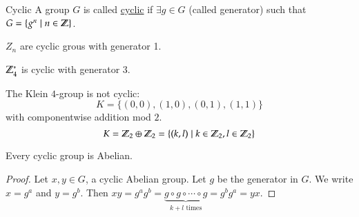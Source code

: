 \begin{defn}{Cyclic}
	A group $G$ is called \ul{cyclic} if $\exists g\in G$ (called generator) such that $G = \{g^n\mid n\in \mathbb{Z}\}$. 
\end{defn}
\example
$Z_n$ are cyclic grous with generator 1. 

$\mathbb{Z}_4^*$ is cyclic with generator $3$. 

\example The Klein $4$-group is not cyclic: 
\[K = \{(0,0), (1,0), (0,1), (1,1)\}\]
with componentwise addition mod $2$. 
\[K = \mathbb{Z}_2\oplus \mathbb{Z}_2 = \{(k,l)\mid k\in \mathbb{Z}_2, l\in \mathbb{Z}_2\}\]

\begin{proposition}
Every cyclic group is Abelian. 	
\end{proposition}
\begin{proof}
Let $x, y\in G$, a cyclic Abelian group. Let $g$ be the generator in $G$. We write $x = g^a$ and $y = g^b$. Then $\displaystyle xy = g^ag^b = \underbrace{g\circ g\circ \cdots \circ g}_{\text{$k+l$ times}} = g^bg^a = yx$. 
\end{proof}


